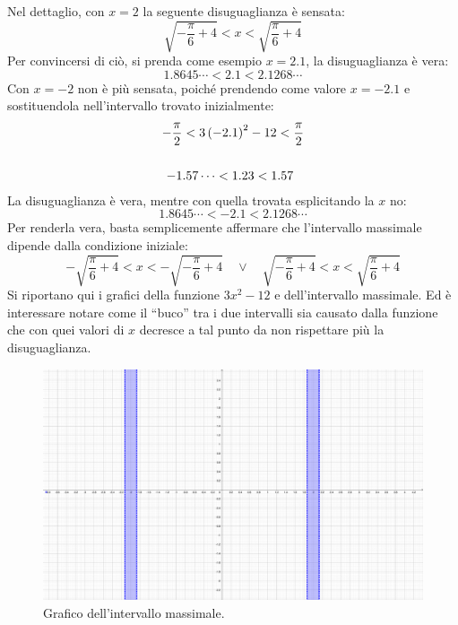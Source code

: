\documentclass[a4paper]{article}
\newcommand{\dquotes}[1]{``#1''}
\begin{document}
	\noindent
	Nel dettaglio, con $x = 2$ la seguente disuguaglianza è sensata:
	\begin{equation*}
		\sqrt{- \dfrac{\pi}{6} + 4} < x < \sqrt{\dfrac{\pi}{6} + 4}
	\end{equation*}
	Per convincersi di ciò, si prenda come esempio $x = 2.1$, la disuguaglianza è vera:
	\begin{equation*}
		1.8645\cdots < 2.1 < 2.1268\cdots
	\end{equation*}
	Con $x = -2$ non è più sensata, poiché prendendo come valore $x = -2.1$ e sostituendola nell'intervallo trovato inizialmente:
	\begin{gather*}
		-\dfrac{\pi}{2} < 3\left(-2.1\right)^{2} - 12 < \dfrac{\pi}{2} \\ \\
		-1.57\cdots < 1.23 < 1.57 \hspace{.5em}
	\end{gather*}
	La disuguaglianza è vera, mentre con quella trovata esplicitando la $x$ no:
	\begin{equation*}
		1.8645\cdots < -2.1 < 2.1268\cdots
	\end{equation*}
	Per renderla vera, basta semplicemente affermare che l'intervallo massimale dipende dalla condizione iniziale:
	\begin{equation*}
		-\sqrt{\dfrac{\pi}{6} + 4} < x < -\sqrt{- \dfrac{\pi}{6} + 4} \hspace{1em} \lor \hspace{1em}
		\sqrt{- \dfrac{\pi}{6} + 4} < x < \sqrt{\dfrac{\pi}{6} + 4}
	\end{equation*}
	Si riportano qui i grafici della funzione $3x^{2} - 12$ e dell'intervallo massimale. Ed è interessare notare come il \dquotes{buco} tra i due intervalli sia causato dalla funzione che con quei valori di $x$ decresce a tal punto da non rispettare più la disuguaglianza.
	\begin{figure}[!htp]
		\centering
		\includegraphics[width=\textwidth]{img/exercise/2023-06-21-A-ex1_2.pdf}
		\caption{Grafico dell'intervallo massimale.}
	\end{figure}\newpage
\end{document}
